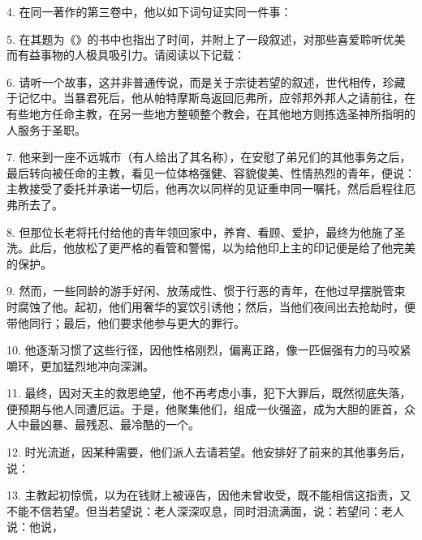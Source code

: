 4. 在同一著作的第三卷中，他以如下词句证实同一件事：\par

5. 在其题为《》的书中也指出了时间，并附上了一段叙述，对那些喜爱聆听优美而有益事物的人极具吸引力。请阅读以下记载：\par

6. 请听一个故事，这并非普通传说，而是关于宗徒若望的叙述，世代相传，珍藏于记忆中。当暴君死后，他从帕特摩斯岛返回厄弗所，应邻邦外邦人之请前往，在有些地方任命主教，在另一些地方整顿整个教会，在其他地方则拣选圣神所指明的人服务于圣职。\par

7. 他来到一座不远城市（有人给出了其名称），在安慰了弟兄们的其他事务之后，最后转向被任命的主教，看见一位体格强健、容貌俊美、性情热烈的青年，便说：主教接受了委托并承诺一切后，他再次以同样的见证重申同一嘱托，然后启程往厄弗所去了。\par

8. 但那位长老将托付给他的青年领回家中，养育、看顾、爱护，最终为他施了圣洗。此后，他放松了更严格的看管和警惕，以为给他印上主的印记便是给了他完美的保护。\par

9. 然而，一些同龄的游手好闲、放荡成性、惯于行恶的青年，在他过早摆脱管束时腐蚀了他。起初，他们用奢华的宴饮引诱他；然后，当他们夜间出去抢劫时，便带他同行；最后，他们要求他参与更大的罪行。\par

10. 他逐渐习惯了这些行径，因他性格刚烈，偏离正路，像一匹倔强有力的马咬紧嚼环，更加猛烈地冲向深渊。\par

11. 最终，因对天主的救恩绝望，他不再考虑小事，犯下大罪后，既然彻底失落，便预期与他人同遭厄运。于是，他聚集他们，组成一伙强盗，成为大胆的匪首，众人中最凶暴、最残忍、最冷酷的一个。\par

12. 时光流逝，因某种需要，他们派人去请若望。他安排好了前来的其他事务后，说：\par

13. 主教起初惊慌，以为在钱财上被诬告，因他未曾收受，既不能相信这指责，又不能不信若望。但当若望说：老人深深叹息，同时泪流满面，说：若望问：老人说：他说，\par

